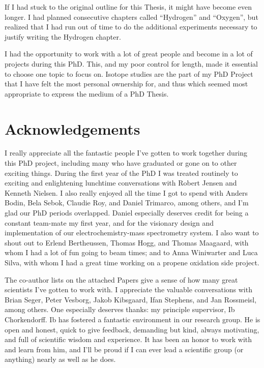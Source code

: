 If I had stuck to the original outline for this Thesis, it might have become even longer. I had planned consecutive chapters called ``Hydrogen'' and ``Oxygen'', but realized that I had run out of time to do the additional experiments necessary to justify writing the Hydrogen chapter. 

I had the opportunity to work with a lot of great people and become in a lot of projects during this PhD. This, and my poor control for length, made it essential to choose one topic to focus on. Isotope studies are the part of my PhD Project that I have felt the most personal ownership for, and thus which seemed most appropriate to express the medium of a PhD Thesis.

\section*{Acknowledgements}

I really appreciate all the fantastic people I've gotten to work together during this PhD project, including many who have graduated or gone on to other exciting things. During the first year of the PhD I was treated routinely to exciting and enlightening lunchtime conversations with Robert Jensen and Kenneth Nielsen. I also really enjoyed all the time I got to spend with Anders Bodin, Bela Sebok, Claudie Roy, and Daniel Trimarco, among others, and I'm glad our PhD periods overlapped. Daniel especially deserves credit for being a constant team-mate my first year, and for the visionary design and implementation of our electrochemistry-mass spectrometry system. I also want to shout out to Erlend Bertheussen, Thomas Hogg, and Thomas Maagaard, with whom I had a lot of fun going to beam times; and to Anna Winiwarter and Luca Silva, with whom I had a great time working on a propene oxidation side project.

The co-author lists on the attached Papers give a sense of how many great scientists I've gotten to work with. I appreciate the valuable conversations with Brian Seger, Peter Vesborg, Jakob Kibsgaard, Ifan Stephens, and Jan Rossmeisl, among others. One especially deserves thanks: my principle supervisor, Ib Chorkendorff. Ib has fostered a fantastic environment in our research group. He is open and honest, quick to give feedback, demanding but kind, always motivating, and full of scientific wisdom and experience. It has been an honor to work with and learn from him, and I'll be proud if I can ever lead a scientific group (or anything) nearly as well as he does.

